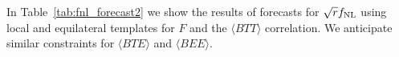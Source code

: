 In Table~\ref{tab:fnl_forecast2} we show the results of forecasts for $\sqrt{r}f_{\rm NL}$ using local and equilateral templates for $F$ and the $\langle BTT\rangle$ correlation. We anticipate similar constraints for $\langle BTE\rangle $ and $\langle BEE\rangle$. 




%

